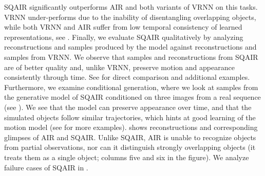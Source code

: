 \Gls{SQAIR} significantly outperforms \gls{AIR} and both variants of \gls{VRNN} on this tasks.
\Gls{VRNN} under-performs due to the inability of disentangling overlapping objects, while both \gls{VRNN} and \gls{AIR} suffer from low temporal consistency of learned representations, see . 
Finally, we evaluate \gls{SQAIR} qualitatively by analyzing reconstructions and samples produced by the model against reconstructions and samples from \gls{VRNN}.
We observe that samples and reconstructions from \gls{SQAIR} are of better quality and, unlike \gls{VRNN}, preserve motion and appearance consistently through time. See  for direct comparison and additional examples.
Furthermore, we examine conditional generation, where we look at samples from the generative model of \gls{SQAIR} conditioned on three images from a real sequence (see ).
We see that the model can preserve appearance over time, and that the simulated objects follow similar trajectories, which hints at good learning of the motion model (see  for more examples).
 shows reconstructions and corresponding glimpses of \gls{AIR} and \gls{SQAIR}. Unlike \gls{SQAIR}, \gls{AIR} is unable to recognize objects from partial observations, nor can it distinguish strongly overlapping objects (it treats them as a single object; columns five and six in the figure).
We analyze failure cases of \gls{SQAIR} in .

% 
% 
% 
% 
% 
% 
% 


